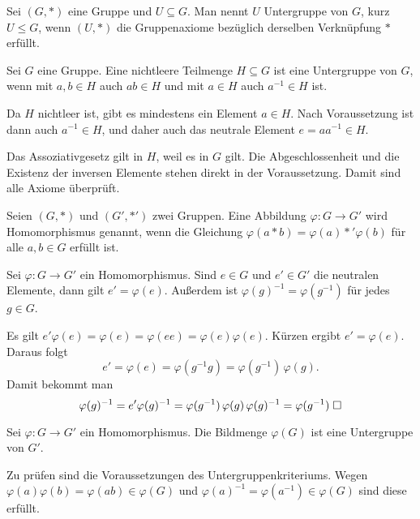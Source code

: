 \begin{Definition}[Untergruppe]\newlinefirst
Sei $(G,*)$ eine Gruppe und $U\subseteq G$.
Man nennt $U$ Untergruppe von $G$, kurz $U\le G$, wenn
$(U,*)$ die Gruppenaxiome bezüglich derselben Verknüpfung $*$
erfüllt.
\end{Definition}

\begin{Satz}[Untergruppenkriterium]\newlinefirst
Sei $G$ eine Gruppe. Eine nichtleere Teilmenge $H\subseteq G$ ist eine
Untergruppe von $G$, wenn mit $a,b\in H$ auch $ab\in H$ und
mit $a\in H$ auch $a^{-1}\in H$ ist.
\end{Satz}
Da $H$ nichtleer ist, gibt es mindestens ein
Element $a\in H$. Nach Voraussetzung ist dann auch $a^{-1}\in H$,
und daher auch das neutrale Element $e=aa^{-1}\in H$.

Das Assoziativgesetz gilt in $H$, weil es in $G$ gilt.
Die Abgeschlossenheit und die Existenz der inversen Elemente
stehen direkt in der Voraussetzung. Damit sind alle Axiome
überprüft.\;\qedsymbol

\begin{Definition}\newlinefirst
Seien $(G,*)$ und $(G',*')$ zwei Gruppen. Eine Abbildung
$\varphi\colon G\to G'$ wird Homomorphismus genannt, wenn die
Gleichung
$\varphi(a*b) = \varphi(a)*'\varphi(b)$
für alle $a,b\in G$ erfüllt ist.
\end{Definition}

\begin{Satz} Sei $\varphi\colon G\to G'$ ein Homomorphismus.
Sind $e\in G$ und $e'\in G'$ die neutralen Elemente, dann gilt
$e'=\varphi(e)$. Außerdem ist $\varphi(g)^{-1}=\varphi(g^{-1})$
für jedes $g\in G$.
\end{Satz}
 Es gilt
$e'\varphi(e) = \varphi(e) = \varphi(ee) = \varphi(e)\varphi(e)$.
Kürzen ergibt $e'=\varphi(e)$. Daraus folgt
\[e' = \varphi(e) = \varphi(g^{-1}g) = \varphi(g^{-1})\,\varphi(g).\]
Damit bekommt man
\[\varphi(g)^{-1} = e'\varphi(g)^{-1}
= \varphi(g^{-1})\,\varphi(g)\,\varphi(g)^{-1}
= \varphi(g^{-1})\;\Box\]

\begin{Satz}\label{hom-img-subgroup}
Sei $\varphi\colon G\to G'$ ein Homomorphismus. Die Bildmenge
$\varphi(G)$ ist eine Untergruppe von $G'$.
\end{Satz}
 Zu prüfen sind die Voraussetzungen des
Untergruppenkriteriums. Wegen $\varphi(a)\varphi(b)
= \varphi(ab)\in\varphi(G)$ und $\varphi(a)^{-1}
= \varphi(a^{-1})\in\varphi(G)$ sind diese erfüllt.\;\qedsymbol

